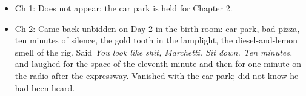 \documentclass{design/chronicle}
\begin{document}
{
\begin{itemize}[leftmargin=1.4em,itemsep=1pt,topsep=3pt,parsep=0pt]

\item Ch 1: Does not appear; the car park is held for Chapter 2.

\item Ch 2: Came back unbidden on Day 2 in the birth room: car park, bad pizza, ten minutes of silence, the gold tooth in the lamplight, the diesel-and-lemon smell of the rig. Said \emph{You look like shit, Marchetti. Sit down. Ten minutes.} and laughed for the space of the eleventh minute and then for one minute on the radio after the expressway. Vanished with the car park; did not know he had been heard.

\end{itemize}
}
\end{document}
